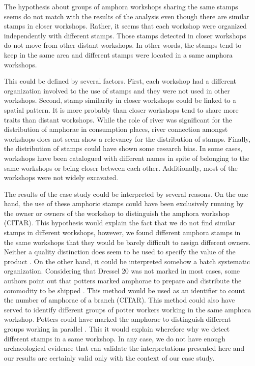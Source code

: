 \documentclass[review]{elsarticle}
\begin{document}
The hypothesis about groups of amphora workshops sharing the same stamps seems do not match with the results of the analysis even though there are similar stamps in closer workshops. Rather, it seems that each workshop were organized independently with different stamps. Those stamps detected in closer workshops do not move from other distant workshops. In other words, the stamps tend to keep in the same area and different stamps were located in a same amphora workshops. 

This could be defined by several factors. First, each workshop had a different organization involved to the use of stamps and they were not used in other workshops. Second, stamp similarity in closer workshops could be linked to a spatial pattern. It is more probably than closer workshops tend to share more traits than distant workshops. While the role of river was significant for the distribution of amphorae in consumption places, river connection amongst workshops does not seem show a relevancy for the distribution of stamps. Finally, the distribution of stamps could have shown some research bias. In some cases, workshops have been catalogued with different names in spite of belonging to the same workshops or being closer between each other. Additionally, most of the workshops were not widely excavated. 


The results of the case study could be interpreted by several reasons. On the one hand, the use of these amphoric stamps could have been exclusively running by the owner or owners of the workshop to distinguish the amphora workshop (CITAR). This hypothesis would explain the fact that we do not find similar stamps in different workshops, however, we found different amphora stamps in the same workshops that they would be barely difficult to assign different owners. Neither a quality distinction does seem to be used to specify the value of the product \citep{callender}. On the other hand, it could be interpreted somehow a batch systematic organization. Considering that Dressel 20 was not marked in most cases, some authors point out that potters marked amphorae to prepare and distribute the commodity to be shipped \citep{berni_millet_epigrafianforica_2008}. This method would be used as an identifier to count the number of amphorae of a branch (CITAR). This method could also have served to identify different groups of potter workers working in the same amphora workshop. Potters could have marked the amphorae to distinguish different groups working in parallel \citep{li_crossbows_2014}. This it would explain wherefore why we detect different stamps in a same workshop. 
In any case, we do not have enough archaeological evidence that can validate the interpretations presented here and our results are certainly valid only with the context of our case study. 
\end{document}
